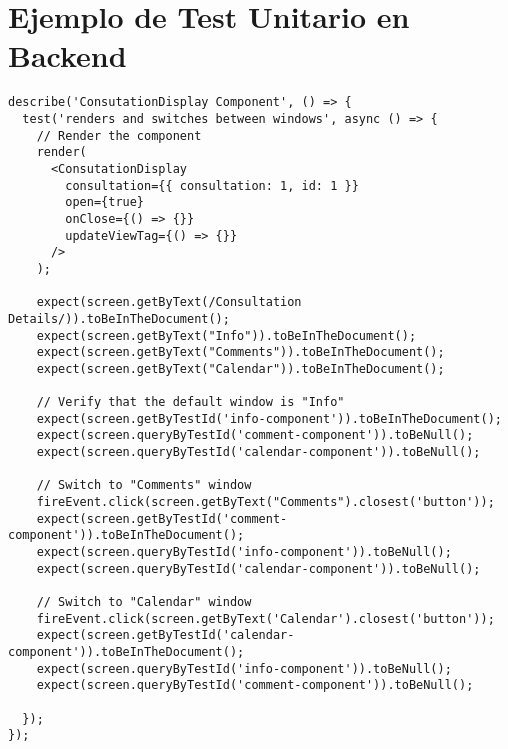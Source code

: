 \section{Ejemplo de Test Unitario en Backend}\label{sec:apendix-unitest-2}

\begin{lstlisting}[caption={Test Unitario Frontend}, label={cod:python}, captionpos=b]
describe('ConsutationDisplay Component', () => {
  test('renders and switches between windows', async () => {
    // Render the component
    render(
      <ConsutationDisplay
        consultation={{ consultation: 1, id: 1 }}
        open={true}
        onClose={() => {}}
        updateViewTag={() => {}}
      />
    );

    expect(screen.getByText(/Consultation Details/)).toBeInTheDocument();
    expect(screen.getByText("Info")).toBeInTheDocument();
    expect(screen.getByText("Comments")).toBeInTheDocument();
    expect(screen.getByText("Calendar")).toBeInTheDocument();

    // Verify that the default window is "Info"
    expect(screen.getByTestId('info-component')).toBeInTheDocument();
    expect(screen.queryByTestId('comment-component')).toBeNull();
    expect(screen.queryByTestId('calendar-component')).toBeNull();

    // Switch to "Comments" window
    fireEvent.click(screen.getByText("Comments").closest('button'));
    expect(screen.getByTestId('comment-component')).toBeInTheDocument();
    expect(screen.queryByTestId('info-component')).toBeNull();
    expect(screen.queryByTestId('calendar-component')).toBeNull();

    // Switch to "Calendar" window
    fireEvent.click(screen.getByText('Calendar').closest('button'));
    expect(screen.getByTestId('calendar-component')).toBeInTheDocument();
    expect(screen.queryByTestId('info-component')).toBeNull();
    expect(screen.queryByTestId('comment-component')).toBeNull();

  });
});
\end{lstlisting}